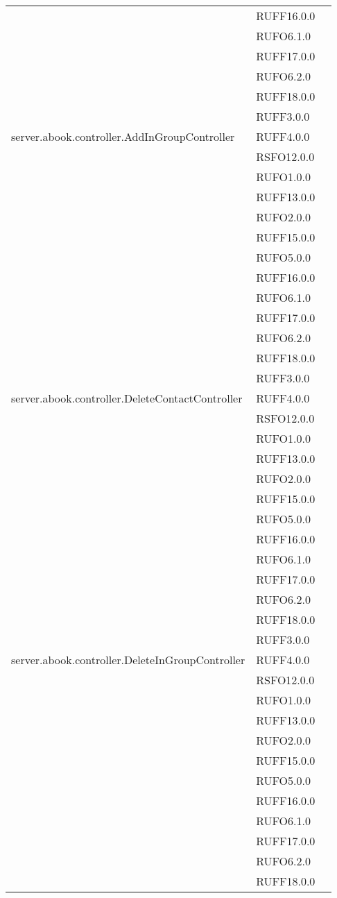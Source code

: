 \begin{center}
\begin{longtable}{lp{}l}
 & RUFF16.0.0 \\
 & RUFO6.1.0 \\
 & RUFF17.0.0 \\
 & RUFO6.2.0 \\
 & RUFF18.0.0 \\
 & RUFF3.0.0 \\
server.abook.controller.AddInGroupController & RUFF4.0.0 \\
 & RSFO12.0.0 \\
 & RUFO1.0.0 \\
 & RUFF13.0.0 \\
 & RUFO2.0.0 \\
 & RUFF15.0.0 \\
 & RUFO5.0.0 \\
 & RUFF16.0.0 \\
 & RUFO6.1.0 \\
 & RUFF17.0.0 \\
 & RUFO6.2.0 \\
 & RUFF18.0.0 \\
 & RUFF3.0.0 \\
server.abook.controller.DeleteContactController & RUFF4.0.0 \\
 & RSFO12.0.0 \\
 & RUFO1.0.0 \\
 & RUFF13.0.0 \\
 & RUFO2.0.0 \\
 & RUFF15.0.0 \\
 & RUFO5.0.0 \\
 & RUFF16.0.0 \\
 & RUFO6.1.0 \\
 & RUFF17.0.0 \\
 & RUFO6.2.0 \\
 & RUFF18.0.0 \\
 & RUFF3.0.0 \\
server.abook.controller.DeleteInGroupController & RUFF4.0.0 \\
 & RSFO12.0.0 \\
 & RUFO1.0.0 \\
 & RUFF13.0.0 \\
 & RUFO2.0.0 \\
 & RUFF15.0.0 \\
 & RUFO5.0.0 \\
 & RUFF16.0.0 \\
 & RUFO6.1.0 \\
 & RUFF17.0.0 \\
 & RUFO6.2.0 \\
 & RUFF18.0.0 \\

\end{longtable}
\end{center}
